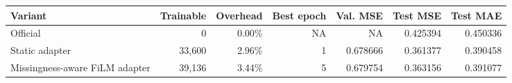 \begin{tabular}{@{}lrrrrrr@{}}
\toprule
Variant & Trainable & Overhead & Best epoch & Val. MSE & Test MSE & Test MAE \\
\midrule
Official & 0 & 0.00\% & NA & NA & 0.425394 & 0.450336 \\
Static adapter & 33,600 & 2.96\% & 1 & 0.678666 & 0.361377 & 0.390458 \\
Missingness-aware FiLM adapter & 39,136 & 3.44\% & 5 & 0.679754 & 0.363156 & 0.391077 \\
\bottomrule
\end{tabular}
